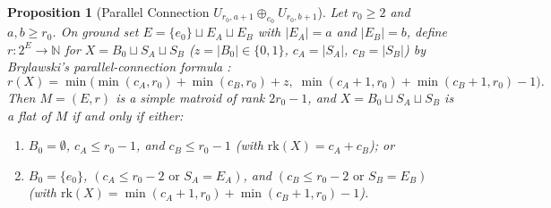 \documentclass[11pt]{article}
\newtheorem{proposition}[theorem]{Proposition}
\theoremstyle{definition}
\theoremstyle{remark}
\newcommand{\rk}{\mathrm{rk}}
\begin{document}
\begin{proposition}[Parallel Connection $U_{r_0, a+1} \oplus_{e_0} U_{r_0, b+1}$]\label{prop:parallel-conn}
Let $r_0 \ge 2$ and $a, b \ge r_0$. On ground set $E = \{e_0\} \sqcup E_A \sqcup E_B$ with $|E_A| = a$ and $|E_B| = b$, define $r : 2^E \to \mathbb{N}$ for $X = B_0 \sqcup S_A \sqcup S_B$ ($z = |B_0| \in \{0, 1\}$, $c_A = |S_A|$, $c_B = |S_B|$) by Brylawski's parallel-connection formula \cite{Brylawski1971}:
\begin{equation}\label{eq:pc-rank}
  r(X) = \min\bigl(\min(c_A, r_0) + \min(c_B, r_0) + z,\; \min(c_A + 1, r_0) + \min(c_B + 1, r_0) - 1\bigr).
\end{equation}
Then $M = (E, r)$ is a simple matroid of rank $2r_0 - 1$, and $X = B_0 \sqcup S_A \sqcup S_B$ is a flat of $M$ if and only if either:
\begin{enumerate}
\item[(i)] $B_0 = \emptyset$, $c_A \le r_0 - 1$, and $c_B \le r_0 - 1$ (with $\rk(X) = c_A + c_B$); or
\item[(ii)] $B_0 = \{e_0\}$, $(c_A \le r_0 - 2 \text{ or } S_A = E_A)$, and $(c_B \le r_0 - 2 \text{ or } S_B = E_B)$ (with $\rk(X) = \min(c_A+1, r_0) + \min(c_B+1, r_0) - 1$).
\end{enumerate}
\end{proposition}
\end{document}
